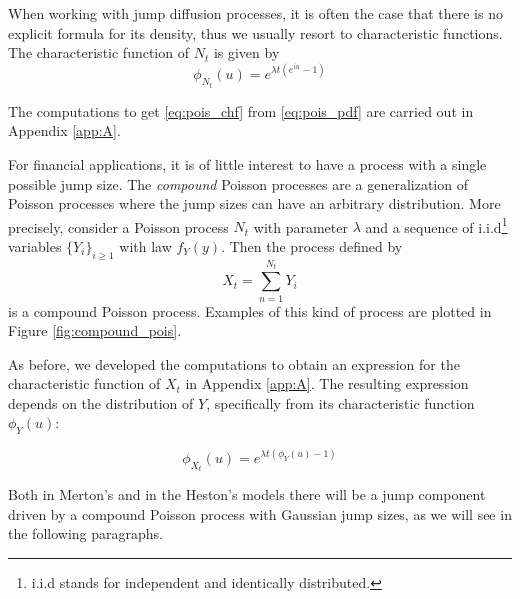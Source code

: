 When working with jump diffusion processes, it is often the case that there is no explicit formula for its density, thus  we usually resort to characteristic functions. The characteristic function of $N_t$ is given by 
\begin{equation}
\label{eq:pois_chf}
	\phi_{N_t}(u)=e^{\lambda t (e^{iu}-1)}
\end{equation}

The computations to get \eqref{eq:pois_chf} from \eqref{eq:pois_pdf} are carried out in Appendix \ref{app:A}. 

\bigskip
For financial applications, it is of little interest to have a process with a single possible jump size. The \textit{compound} Poisson processes are a generalization of Poisson processes  where  the jump sizes can have an arbitrary distribution. More precisely, consider a Poisson process $N_t$ with parameter $\lambda$ and a sequence of i.i.d\footnote{i.i.d stands for independent and identically distributed.} variables $\{Y_i\}_{i\geq 1}$ with law $f_Y(y)$. Then the process defined by
\begin{equation}
	X_t = \sum_{n=1}^{N_t} Y_i
\end{equation}
is a compound Poisson process. Examples of this kind of process are plotted in Figure \ref{fig:compound_pois}.

As before, we developed the computations to obtain an expression for the characteristic function of $X_t$ in Appendix \ref{app:A}. The resulting expression depends on the distribution of $Y$, specifically from its characteristic function $\phi_Y(u)$:

\begin{equation}
	\phi_{X_t}(u) = e^{\lambda t (\phi_Y(u)-1)}
\end{equation}

Both in Merton's and in the Heston's models there will be a jump component driven by a compound Poisson process with Gaussian jump sizes, as we will see in the following paragraphs.

